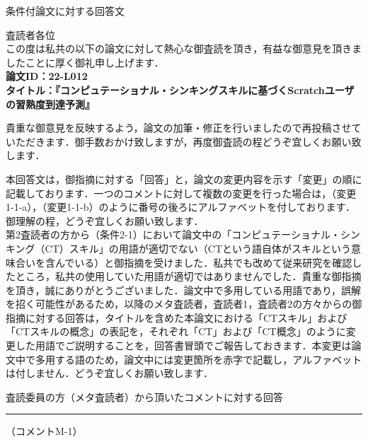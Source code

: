 \documentclass{jarticle} %
\def\restitle{条件付論文に対する回答文}
\def\section#1{ \vspace{3pc} {\large \gt #1} \vspace{1pc} \hrule }
\def\subsection#1{ \vspace{1pc} {\gt #1} }
\begin{document}
{\Large \gt \restitle}

\vspace{3pc}

査読者各位\\


この度は私共の以下の論文に対して熱心な御査読を頂き，有益な御意見を頂きましたことに厚く御礼申し上げます．\\
\textbf{論文ID：22-L012}\\
\textbf{タイトル：『コンピュテーショナル・シンキングスキルに基づくScratchユーザの習熟度到達予測』}

貴重な御意見を反映するよう，論文の加筆・修正を行いましたので再投稿させていただきます．御手数おかけ致しますが，再度御査読の程どうぞ宜しくお願い致します．	

本回答文は，御指摘に対する「回答」と，論文の変更内容を示す「変更」の順に記載しております．一つのコメントに対して複数の変更を行った場合は，（変更1-1-a），（変更1-1-b）のように番号の後ろにアルファベットを付しております．御理解の程，どうぞ宜しくお願い致します．\\

第2査読者の方から（条件2-1）において論文中の「コンピュテーショナル・シンキング（CT）スキル」の用語が適切でない（CTという語自体がスキルという意味合いを含んでいる）と御指摘を受けました．私共でも改めて従来研究を確認したところ，私共の使用していた用語が適切ではありませんでした．貴重な御指摘を頂き，誠にありがとうございました．論文中で多用している用語であり，誤解を招く可能性があるため，以降のメタ査読者，査読者1，査読者2の方々からの御指摘に対する回答は，タイトルを含めた本論文における「CTスキル」および「CTスキルの概念」の表記を，それぞれ「CT」および「CT概念」のように変更した用語でご説明することを，回答書冒頭でご報告しておきます．本変更は論文中で多用する語のため，論文中には変更箇所を赤字で記載し，アルファベットは付しません．どうぞ宜しくお願い致します．

\section{査読委員の方（メタ査読者）から頂いたコメントに対する回答}

\subsection{（コメントM-1）}
\end{document}
